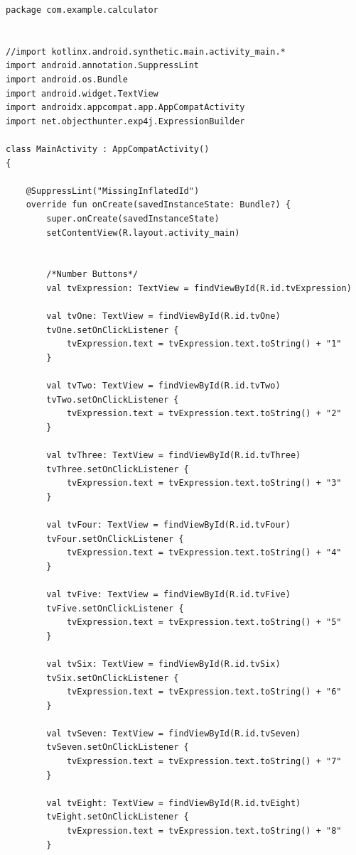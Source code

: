 \documentclass[a4paper, 14pt]{extarticle}
\begin{document}
\begin{lstlisting}[language={},caption={Калькулятор на Kotlin},label={lst:code1}]
package com.example.calculator


//import kotlinx.android.synthetic.main.activity_main.*
import android.annotation.SuppressLint
import android.os.Bundle
import android.widget.TextView
import androidx.appcompat.app.AppCompatActivity
import net.objecthunter.exp4j.ExpressionBuilder

class MainActivity : AppCompatActivity()
{

    @SuppressLint("MissingInflatedId")
    override fun onCreate(savedInstanceState: Bundle?) {
        super.onCreate(savedInstanceState)
        setContentView(R.layout.activity_main)


        /*Number Buttons*/
        val tvExpression: TextView = findViewById(R.id.tvExpression)

        val tvOne: TextView = findViewById(R.id.tvOne)
        tvOne.setOnClickListener {
            tvExpression.text = tvExpression.text.toString() + "1"
        }

        val tvTwo: TextView = findViewById(R.id.tvTwo)
        tvTwo.setOnClickListener {
            tvExpression.text = tvExpression.text.toString() + "2"
        }

        val tvThree: TextView = findViewById(R.id.tvThree)
        tvThree.setOnClickListener {
            tvExpression.text = tvExpression.text.toString() + "3"
        }

        val tvFour: TextView = findViewById(R.id.tvFour)
        tvFour.setOnClickListener {
            tvExpression.text = tvExpression.text.toString() + "4"
        }

        val tvFive: TextView = findViewById(R.id.tvFive)
        tvFive.setOnClickListener {
            tvExpression.text = tvExpression.text.toString() + "5"
        }

        val tvSix: TextView = findViewById(R.id.tvSix)
        tvSix.setOnClickListener {
            tvExpression.text = tvExpression.text.toString() + "6"
        }

        val tvSeven: TextView = findViewById(R.id.tvSeven)
        tvSeven.setOnClickListener {
            tvExpression.text = tvExpression.text.toString() + "7"
        }

        val tvEight: TextView = findViewById(R.id.tvEight)
        tvEight.setOnClickListener {
            tvExpression.text = tvExpression.text.toString() + "8"
        }


\end{lstlisting}
\end{document}
